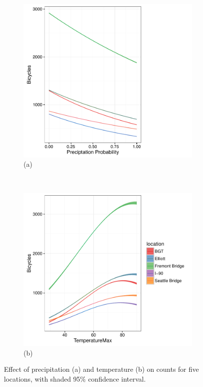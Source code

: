 \documentclass [11pt, proquest] {uwthesis}[2015/03/03]
\begin{document}
\begin{figure}[t!]
    \centering
    \begin{subfigure}[t]{0.5\textwidth}
        \centering
        \includegraphics[width=1\textwidth]{figures/5sites/Sim_precip1} 
        \caption{(a)}
    \end{subfigure}%
    ~
    \begin{subfigure}[t]{0.5\textwidth}
        \centering
        \includegraphics[width=1\textwidth]{figures/5sites/Sim_temp} 
        \caption{(b)}
    \end{subfigure}
    \caption{Effect of precipitation (a) and temperature (b) on counts for five locations, with shaded 95\% confidence interval.}
    \label{fig:Sim_temp_precip}
\end{figure}
\end{document}
